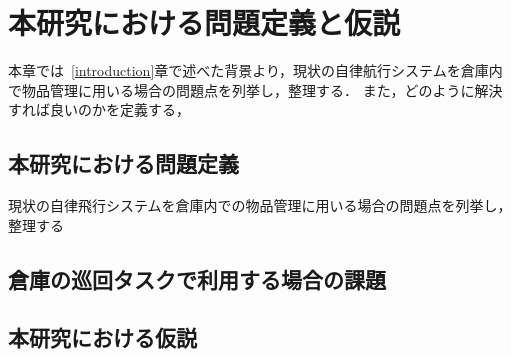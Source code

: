 \chapter{本研究における問題定義と仮説}
\label{issue}
本章では~\ref{introduction}章で述べた背景より，現状の自律航行システムを倉庫内で物品管理に用いる場合の問題点を列挙し，整理する．
また，どのように解決すれば良いのかを定義する，

\section{本研究における問題定義}
現状の自律飛行システムを倉庫内での物品管理に用いる場合の問題点を列挙し，整理する

\section{倉庫の巡回タスクで利用する場合の課題}




% 
% 

\section{本研究における仮説}




